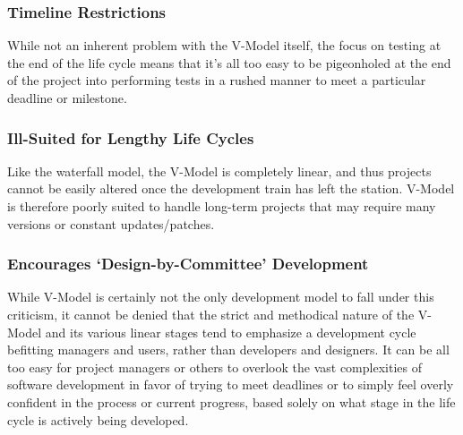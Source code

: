 \documentclass[main.tex]{subfiles}
\begin{document}
\subsubsection{Timeline Restrictions}
While not an inherent problem with the V-Model itself, the focus on testing at the end of the life cycle means that it’s all too easy to be pigeonholed at the end of the project into performing tests in a rushed manner to meet a particular deadline or milestone.

\subsubsection{Ill-Suited for Lengthy Life Cycles}
Like the waterfall model, the V-Model is completely linear, and thus projects cannot be easily altered once the development train has left the station.
V-Model is therefore poorly suited to handle long-term projects that may require many versions or constant updates/patches.

\subsubsection{Encourages ‘Design-by-Committee’ Development}
While V-Model is certainly not the only development model to fall under this criticism, it cannot be denied that the strict and methodical nature of the V-Model and its various linear stages tend to emphasize a development cycle befitting managers and users, rather than developers and designers.
It can be all too easy for project managers or others to overlook the vast complexities of software development in favor of trying to meet deadlines or to simply feel overly confident in the process or current progress, based solely on what stage in the life cycle is actively being developed.

\nocite{*}
\end{document}
